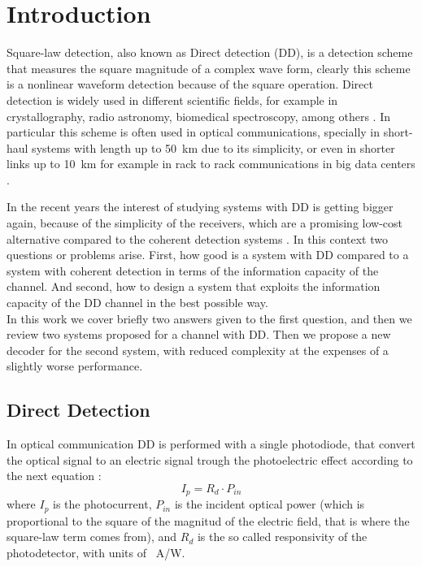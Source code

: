 \chapter{Introduction}
\label{ch:introduction}


	

Square-law detection, also known as Direct detection (DD), is a detection scheme that measures the square magnitude of a complex wave form, clearly this scheme is a nonlinear waveform detection because of the square operation. Direct detection is widely used in different scientific fields, for example in crystallography, radio astronomy, biomedical spectroscopy, among others \cite{Tasbihi_Tukey}. In particular this scheme is often used in optical communications, specially in short-haul systems with length up to \SI{50}{\km} \cite{Agrawal_ch1} due to its simplicity, or even in shorter links up to \SI{10}{\km} for example in rack to rack communications in big data centers \cite{Tasbihi_Tukey}.\\

In the recent years the interest of studying systems with DD is getting bigger again, because of the simplicity of the receivers, which are a promising low-cost alternative compared to the coherent detection systems \cite{Mecozzi_2018}. In this context two questions or problems arise. First, how good is a system with DD compared to a system with coherent detection in terms of the information capacity of the channel. And second, how to design a system that exploits the information capacity of the DD channel in the best possible way.\\

In this work we cover briefly two answers given to the first question, and then we review two systems proposed for a channel with DD. Then we propose a new decoder for the second system, with reduced complexity at the expenses of a slightly worse performance.




\section{Direct Detection}
\label{sec:Direct_Detection}

In optical communication DD is performed with a single photodiode, that convert the optical signal to an electric signal trough the photoelectric effect according to the next equation \cite{Agrawal_ch4}:
\begin{equation}
I_p = R_d\cdot P_{in}
\label{eq:photocurrent}
\end{equation}
where $I_p$ is the photocurrent, $P_{in}$ is the incident optical power (which is proportional to the square of the magnitud of the electric field, that is where the square-law term comes from), and $R_d$ is the so called responsivity of the photodetector, with units of \SI{}{\A/\W}.\\

